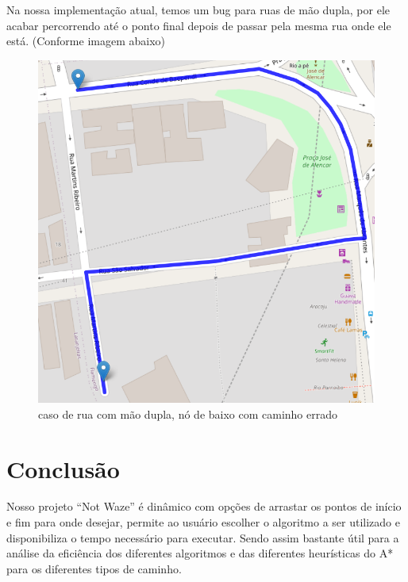 \documentclass{article}
\begin{document}
Na nossa implementação atual, temos um bug para ruas de mão dupla, por ele acabar percorrendo até o ponto final depois de passar pela mesma rua onde ele está. (Conforme imagem abaixo)

\begin{figure}[H]
    \centering
    \includegraphics[scale=0.5]{EDA_two_way_street_bug.png}
    \caption{caso de rua com mão dupla, nó de baixo com caminho errado}
    \label{fig7}
\end{figure}

\section{Conclusão}
Nosso projeto ``Not Waze'' é dinâmico com opções de arrastar os pontos de início e fim para onde desejar, permite ao usuário escolher o algoritmo a ser utilizado e disponibiliza o tempo necessário para executar. Sendo assim bastante útil para a análise da eficiência dos diferentes algoritmos e das diferentes heurísticas do A* para os diferentes tipos de caminho.  
\end{document}
